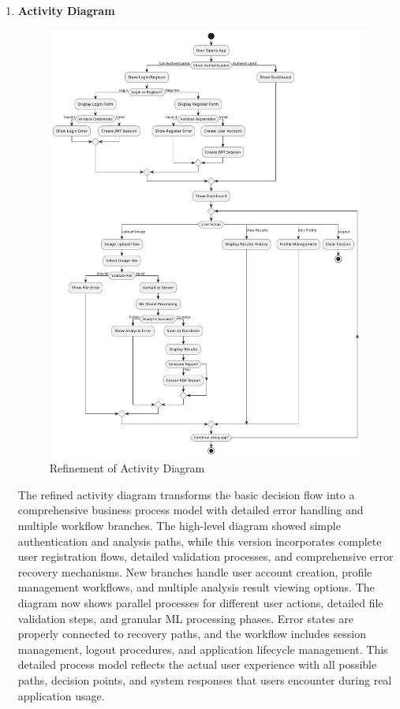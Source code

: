 \begin{enumerate}[label=\roman*.]
    \item \textbf{Activity Diagram}
          \begin{center}
              \begin{figure}[H]
                  \centering
                  \includegraphics[width=0.8\linewidth]{Images/Refined/activity.pdf}
                  \caption{Refinement of Activity Diagram}
                  \label{fig:RefinementofActivityDiagram}
              \end{figure}
          \end{center}
          The refined activity diagram transforms the basic decision flow into a comprehensive business process model with detailed error handling and multiple workflow branches. The high-level diagram showed simple authentication and analysis paths, while this version incorporates complete user registration flows, detailed validation processes, and comprehensive error recovery mechanisms. New branches handle user account creation, profile management workflows, and multiple analysis result viewing options. The diagram now shows parallel processes for different user actions, detailed file validation steps, and granular ML processing phases. Error states are properly connected to recovery paths, and the workflow includes session management, logout procedures, and application lifecycle management. This detailed process model reflects the actual user experience with all possible paths, decision points, and system responses that users encounter during real application usage.

\end{enumerate}
